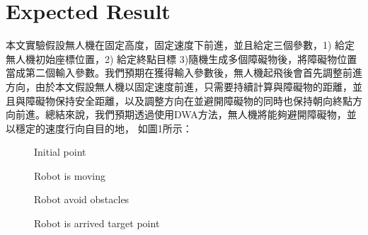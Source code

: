 \documentclass[crop=false]{standalone}
\begin{document}
	\section{Expected Result}
	本文實驗假設無人機在固定高度，固定速度下前進，並且給定三個參數，1) 給定無人機初始座標位置，2) 給定終點目標 3)隨機生成多個障礙物後，將障礙物位置當成第二個輸入參數。我們預期在獲得輸入參數後，無人機起飛後會首先調整前進方向，由於本文假設無人機以固定速度前進，只需要持續計算與障礙物的距離，並且與障礙物保持安全距離，以及調整方向在並避開障礙物的同時也保持朝向終點方向前進。總結來說，我們預期透過使用DWA方法，無人機將能夠避開障礙物，並以穩定的速度行向自目的地， 如圖1所示：
    
    \begin{figure}[htbp]	
    	\centering
    	\begin{minipage}{0.49\linewidth}
    		\centering
    		\caption{Initial point}
    		\label{Initial robot point}%
    	\end{minipage}
    	\begin{minipage}{0.49\linewidth}
    		\centering
    		\caption{Robot is moving}
    		\label{Moving robot}%
    	\end{minipage}
    	
    	\begin{minipage}{0.49\linewidth}
    		\centering
    		\caption{Robot avoid obstacles}
    		\label{Robot avoid obstacles}%
    	\end{minipage}
    	\begin{minipage}{0.49\linewidth}
    		\centering
    		\caption{Robot is arrived target point}
    		\label{Robot is arrived target point}%
    	\end{minipage}
    \end{figure}
\end{document}
